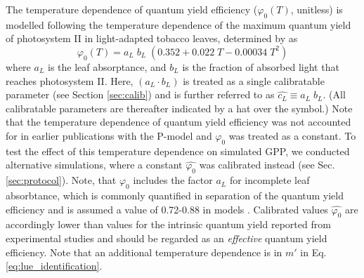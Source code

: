 \documentclass{myreport}
\begin{document}
The temperature dependence of quantum yield efficiency ($\varphi_0(T)$, unitless) is modelled following the temperature dependence of the maximum quantum yield of photosystem II in light-adapted tobacco leaves, determined by \cite{bernacchi03pce} as 
\begin{equation}
\varphi_0(T) = a_L \; b_L \; ( 0.352 + 0.022\;T - 0.00034\;T^2 )
\end{equation}
where $a_L$ is the leaf absorptance, and $b_L$ is the fraction of absorbed light that reaches photosystem II. Here, $(a_L \cdot b_L)$ is treated as a single calibratable parameter (see Section \ref{sec:calib}) and is further referred to as $\widehat{c_L}\equiv a_L\; b_L$. (All calibratable parameters are thereafter indicated by a hat over the symbol.) Note that the temperature dependence of quantum yield efficiency was not accounted for in earlier publications with the P-model \citep{keenan17natcomm, wang17natpl} and $\varphi_0$ was treated as a constant. To test the effect of this temperature dependence on simulated GPP, we conducted alternative simulations, where a constant $\widehat{\varphi_0}$ was calibrated instead (see Sec. \ref{sec:protocol}). Note, that $\varphi_0$  includes the factor $a_L$ for incomplete leaf absorbtance, which is commonly quantified in separation of the quantum yield efficiency and is assumed a value of 0.72-0.88 in models \citep{rogers17}. Calibrated values $\widehat{\varphi_0}$ are accordingly lower than values for the intrinsic quantum yield reported from experimental studies \citep{long93, singsaas01} and should be regarded as an \textit{effective} quantum yield efficiency. Note that an additional temperature dependence is in $m'$ in Eq. \ref{eq:lue_identification}.
\end{document}
